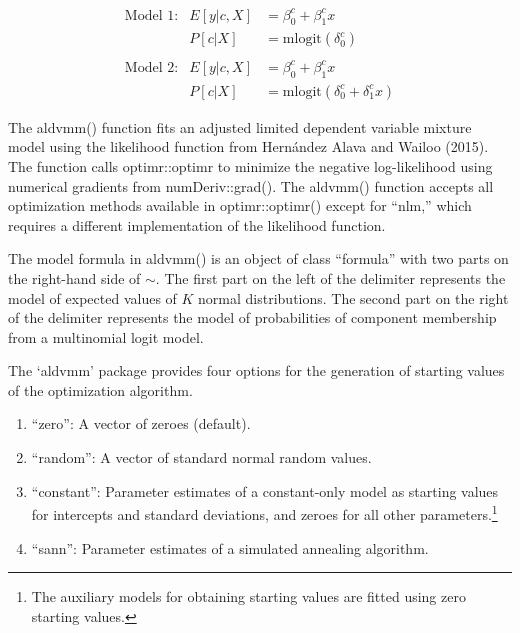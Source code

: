 \documentclass[
]{article}
\begin{document}
\begin{equation}
\label{eq:models}
\begin{array}{lrl}
\text{Model 1:}& E[y|c, X] &= \beta_{0}^{c} + \beta_{1}^{c}x\\
& P[c|X]    &= \text{mlogit}(\delta_{0}^{c})\\
&&\\
\text{Model 2:}& E[y|c, X] &= \beta_{0}^{c}  + \beta_{1}^{c}x\\
& P[c|X]    &= \text{mlogit}(\delta_{0}^{c} + \delta_{1}^{c}x)
\end{array}
\end{equation}

The aldvmm() function fits an adjusted limited dependent variable mixture model using the likelihood function from Hernández Alava and Wailoo (2015). The function calls optimr::optimr to minimize the negative log-likelihood using numerical gradients from numDeriv::grad(). The aldvmm() function accepts all optimization methods available in optimr::optimr() except for ``nlm,'' which requires a different implementation of the likelihood function.

The model formula in aldvmm() is an object of class ``formula'' with two parts on the right-hand side of \(\sim\). The first part on the left of the \textbar{} delimiter represents the model of expected values of \(K\) normal distributions. The second part on the right of the \textbar{} delimiter represents the model of probabilities of component membership from a multinomial logit model.

The `aldvmm' package provides four options for the generation of starting values of the optimization algorithm.

\begin{enumerate}
\def\labelenumi{\arabic{enumi}.}
\item
  ``zero'': A vector of zeroes (default).
\item
  ``random'': A vector of standard normal random values.
\item
  ``constant'': Parameter estimates of a constant-only model as starting values for intercepts and standard deviations, and zeroes for all other parameters.\footnote{The auxiliary models for obtaining starting values are fitted using zero starting values.}
\item
  ``sann'': Parameter estimates of a simulated annealing algorithm.
\end{enumerate}
\end{document}
